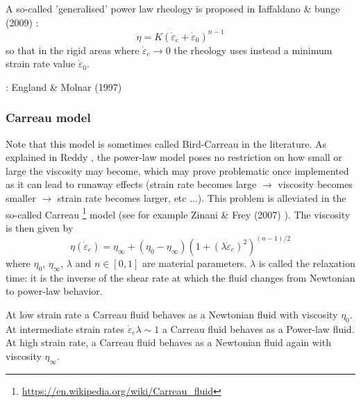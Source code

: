 A so-called 'generalised' power law rheology is proposed in Iaffaldano \& bunge (2009) \cite{iabu09}:
\begin{equation}
\eta = K (\dot{\varepsilon}_{e}+\dot{\varepsilon}_0)^{n-1}
\end{equation}
so that in the rigid areas where $\dot{\varepsilon}_e \rightarrow 0$ the rheology 
uses instead a minimum strain rate value $\dot{\varepsilon}_0$.

\Literature: England \& Molnar (1997) \cite{enmo97}

\subsubsection{Carreau model}

Note that this model is sometimes called Bird-Carreau in the literature. 
As explained in Reddy \cite{reddybook2}, the power-law model poses no restriction on 
how small or large the viscosity may become, which may prove problematic once 
implemented as it can lead to runaway effects (strain rate becomes large $\rightarrow$
viscosity becomes smaller $\rightarrow$ strain rate becomes larger, etc ...).
This problem is alleviated in the so-called Carreau
\footnote{\url{https://en.wikipedia.org/wiki/Carreau_fluid}} model \cite{carr72} 
(see for example Zinani \& Frey (2007) \cite{zifr07}). 
The viscosity is then given by
\begin{equation}
\eta(\dot{\varepsilon}_{e}) = \eta_\infty + (\eta_0-\eta_\infty) \left(1 + (\lambda \dot{\varepsilon}_{e})^2 \right)^{(n-1)/2}
\end{equation}
where $\eta_0$, $\eta_\infty$, $\lambda$ and $n\in[0,1]$ are material parameters. 
$\lambda$ is called the relaxation time: it is the inverse of the shear rate at which 
the fluid changes from Newtonian to power-law behavior.

At low strain rate a Carreau fluid behaves as a Newtonian fluid with viscosity $\eta_0$.
At intermediate strain rates $\dot{\varepsilon}_{e} \lambda \sim 1$ a Carreau fluid behaves 
as a Power-law fluid. At high strain rate, a Carreau fluid behaves as a Newtonian fluid 
again with viscosity $\eta_\infty$.
 
